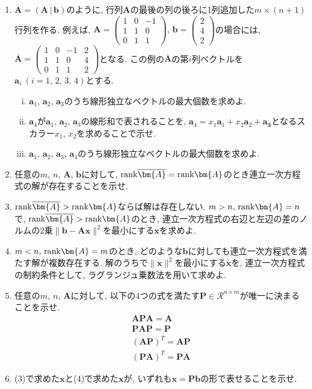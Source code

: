 \documentclass[dvipdfmx,titlepage, 11pt, a4paper]{jsarticle}%
\begin{document}
\begin{enumerate}[(1)]
	\setlength{\itemsep}{10pt}
	\item $\overline{\bm{A}}=(\bm{A}\,|\,\bm{b})$のように, 行列$\bm{A}$の最後の列の後ろに1列追加した$m\times (n+1)$行列を作る. 例えば, $\bm{A}=\begin{pmatrix}1&0&-1\\1&1&0\\0&1&1\end{pmatrix},\,\bm{b}=\begin{pmatrix}2\\4\\2\end{pmatrix}$の場合には, $\overline{\bm{A}}=\begin{pmatrix}1&0&-1&2\\1&1&0&4\\0&1&1&2\end{pmatrix}$となる. この例の$\overline{\bm{A}}$の第$i$列ベクトルを$\bm{a}_{i}\ (i=1,\,2,\,3,\,4)$とする.
	      \begin{enumerate}[(i)]
		      \item $\bm{a}_{1},\,\bm{a}_{2},\,\bm{a}_{3}$のうち線形独立なベクトルの最大個数を求めよ.
		      \item $\bm{a}_{4}$が$\bm{a}_{1},\,\bm{a}_{2},\,\bm{a}_{3}$の線形和で表されることを, $\bm{a}_{4}=x_{1}\bm{a}_{1}+x_{2}\bm{a}_{2}+\bm{a_{3}}$となるスカラー$x_{1},\,x_{2}$を求めることで示せ.
		      \item $\bm{a}_{1},\,\bm{a}_{2},\,\bm{a}_{3},\,\bm{a}_{4}$のうち線形独立なベクトルの最大個数を求めよ.
	      \end{enumerate}
	\item 任意の$m,\,n,\,\bm{A},\,\bm{b}$に対して, ${\rm rank}\overline{\bm{A}}={\rm rank}\bm{A}$のとき連立一次方程式の解が存在することを示せ.
	\item ${\rm rank}\overline{\bm{A}}>{\rm rank}\bm{A}$ならば解は存在しない. $m>n,\,{\rm rank}\bm{A}=n$で, ${\rm rank}\overline{\bm{A}}>{\rm rank}\bm{A}$のとき, 連立一次方程式の右辺と左辺の差のノルムの2乗$\|\bm{b}-\bm{Ax}\|^{2}$を最小にする$\bm{x}$を求めよ.
	\item $m<n,\,{\rm rank}\bm{A}=m$のとき, どのような$\bm{b}$に対しても連立一次方程式を満たす解が複数存在する. 解のうちで$\|\bm{x}\|^{2}$を最小にする$\bm{x}$を, 連立一次方程式の制約条件として, ラグランジュ乗数法を用いて求めよ.
	\item 任意の$m,\,n,\,\bm{A}$に対して, 以下の4つの式を満たす$\bm{P}\in\mathcal{R}^{n\times m}$が唯一に決まることを示せ.
	      \begin{eqnarray*}
		      \bm{APA}=\bm{A}\\
		      \bm{PAP}=\bm{P}\\
		      (\bm{AP})^{T}=\bm{AP}\\
		      (\bm{PA})^{T}=\bm{PA}
	      \end{eqnarray*}
	\item (3)で求めた$\bm{x}$と(4)で求めた$\bm{x}$が, いずれも$\bm{x}=\bm{Pb}$の形で表せることを示せ.
\end{enumerate}
\end{document}

